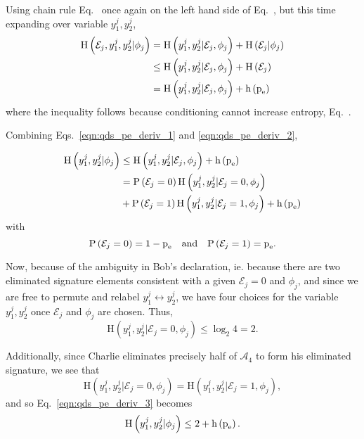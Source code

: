 \noindent Using chain rule Eq.~ once again on the left hand side of Eq.~, but this time expanding over variable $y_1^j, y_2^j$,
\begin{align}\label{eqn:qds_pe_deriv_2}
\text{H}\left( \mathcal{E}_j, y_1^j, y_2^j | \phi_j \right) &=
\text{H}\left(y_1^j, y_2^j | \mathcal{E}_j, \phi_j\right) + \text{H}\left(\mathcal{E}_j | \phi_j\right) \notag \\
&\le \text{H}\left(y_1^j, y_2^j | \mathcal{E}_j, \phi_j\right) + \text{H}\left(\mathcal{E}_j\right) \notag \\
&= \text{H}\left(y_1^j, y_2^j | \mathcal{E}_j, \phi_j\right) + \text{h}\left(\text{p}_{\text{e}}\right)
\end{align}
where the inequality follows because conditioning cannot increase entropy, Eq.~.

Combining Eqs.~\ref{eqn:qds_pe_deriv_1} and \ref{eqn:qds_pe_deriv_2},

\begin{align}\label{eqn:qds_pe_deriv_3}
\text{H}\left(y_1^j, y_2^j | \phi_j\right) &\le \text{H}\left(y_1^j, y_2^j | \mathcal{E}_j, \phi_j\right) + \text{h}\left(\text{p}_{\text{e}}\right) \notag \\
&= \text{P}\left(\mathcal{E}_j=0\right) \text{H}\left(y_1^j, y_2^j | \mathcal{E}_j=0, \phi_j\right) \notag \\
&+ \text{P}\left(\mathcal{E}_j=1\right) \text{H}\left(y_1^j, y_2^j | \mathcal{E}_j=1, \phi_j\right) + \text{h}\left(\text{p}_{\text{e}}\right)
\end{align}
with
\begin{equation}
\text{P}\left(\mathcal{E}_j=0\right) = 1 - \pe \qq{and} \text{P}\left(\mathcal{E}_j=1\right) = \pe.
\end{equation}

\noindent Now, because of the ambiguity in Bob's declaration, ie. because there are two eliminated signature elements consistent with a given $\mathcal{E}_j=0$ and $\phi_j$, and since we are free to permute and relabel $y_1^j \leftrightarrow y_2^j$, we have four choices for the variable $y_1^j, y_2^j$ once $\mathcal{E}_j$ and $\phi_j$ are chosen. Thus,
\begin{equation}
\text{H}\left(y_1^j, y_2^j | \mathcal{E}_j=0, \phi_j\right) \le \log_2 4 = 2.
\end{equation}

\noindent Additionally, since Charlie eliminates precisely half of $\mathcal{A}_4$ to form his eliminated signature, we see that
\begin{equation}
\text{H}\left(y_1^j, y_2^j | \mathcal{E}_j=0, \phi_j\right) = \text{H}\left(y_1^j, y_2^j | \mathcal{E}_j=1, \phi_j\right),
\end{equation}
and so Eq.~\ref{eqn:qds_pe_deriv_3} becomes
\begin{equation}\label{eqn:qds_pe_deriv_4}
\text{H}\left(y_1^j, y_2^j | \phi_j\right) \le 2 + \text{h}\left(\text{p}_{\text{e}}\right).
\end{equation}

